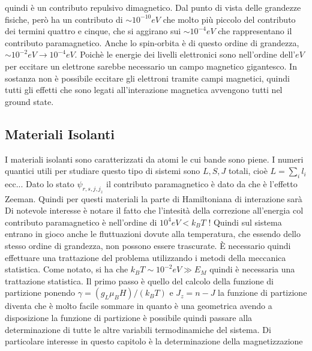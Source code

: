 \documentclass[a4paper,12pt]{article}
\begin{document}
quindi è un contributo repulsivo dimagnetico. Dal punto di vista delle grandezze fisiche, però ha un contributo di $\sim 10^{-10}eV$ che molto più piccolo del contributo dei termini quattro e cinque, che si aggirano sui $\sim 10^{-4}eV$ che rappresentano il contributo paramagnetico. Anche lo spin-orbita è di questo ordine di grandezza, $\sim 10^{-2}eV \to 10^{-4}eV$.
Poichè le energie dei livelli elettronici sono nell'ordine dell'$eV$ per eccitare un elettrone sarebbe necessario un campo magnetico gigantesco. In sostanza non è possibile eccitare gli elettroni tramite campi magnetici, quindi tutti gli effetti che sono legati all'interazione magnetica avvengono tutti nel ground state.
\subsection{Materiali Isolanti}
I materiali isolanti sono caratterizzati da atomi le cui bande sono piene. I numeri quantici utili per studiare questo tipo di sistemi sono $L,S,J$ totali, cioè $L=\sum_i l_i$ ecc... Dato lo stato $\psi_{r,s,j,j_z}$ il contributo paramagnetico è dato da
che è l'effetto Zeeman. Quindi per questi materiali la parte di Hamiltoniana di interazione sarà
Di notevole interesse è notare il fatto che l'intesità della correzione all'energia col contributo paramagnetico è nell'ordine di $10^4eV <k_BT$ ! Quindi sul sistema entrano in gioco anche le fluttuazioni dovute alla temperatura, che essendo dello stesso ordine di grandezza, non possono essere trascurate. \`E necessario quindi effettuare una trattazione del problema utilizzando i metodi della meccanica statistica. Come notato, si ha che $k_BT\sim10^{-2}eV \gg E_M$ quindi è necessaria una trattazione statistica. Il primo passo è quello del calcolo della funzione di partizione
ponendo $\gamma = (g_L \mu_B H) / (k_B T)$ e $J_z = n-J$ la funzione di partizione diventa
che è molto facile sommare in quanto è una geometrica 
avendo a disposizione la funzione di partizione è possibile quindi passare alla determinazione di tutte le altre variabili termodinamiche del sistema. Di particolare interesse in questo capitolo è la determinazione della magnetizzazione
\end{document}
